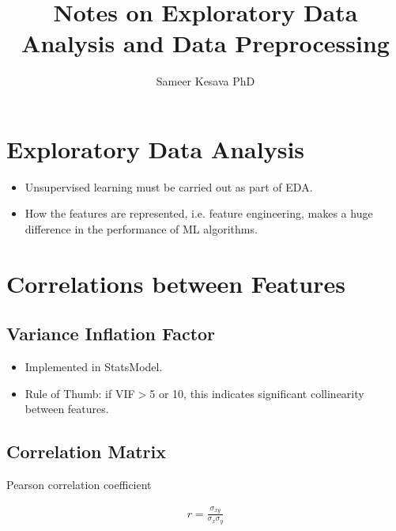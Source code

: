 \documentclass[a4paper, 12pt]{report}
\begin{document}
\title{Notes on Exploratory Data Analysis and Data Preprocessing}
\author{Sameer Kesava PhD}
\maketitle

\tableofcontents
\newpage



\chapter{Exploratory Data Analysis}
\begin{itemize}
\item Unsupervised learning must be carried out as part of EDA.
\item How the features are represented, i.e. feature engineering, makes a huge difference in the performance of ML algorithms.

\end{itemize}

\chapter{Correlations between Features}

\section{Variance Inflation Factor}
\begin{itemize}
\item Implemented in {\color{green}StatsModel}.
\item Rule of Thumb: if VIF$>$5 or 10, this indicates significant collinearity between features.

\end{itemize}

\section{Correlation Matrix}

Pearson correlation coefficient

\begin{align}
	r = \frac{\sigma{_{xy}}}{\sigma{_{x}}\sigma{_{y}}}
\end{align}
\end{document}
